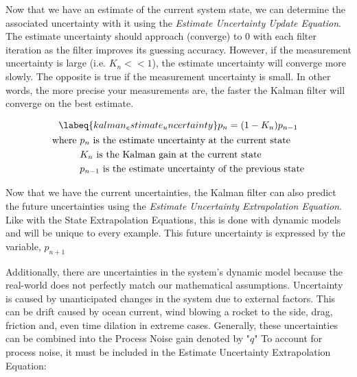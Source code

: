 
Now that we have an estimate of the current system state, we can determine the associated uncertainty with it using the \textit{Estimate Uncertainty Update Equation}. 
The estimate uncertainty should approach (converge) to 0 with each filter iteration as the filter improves its guessing accuracy.
However, if the measurement uncertainty is large (i.e. $K_n << 1$), the estimate uncertainty will converge more slowly.
The opposite is true if the measurement uncertainty is small.
In other words, the more precise your measurements are, the faster the Kalman filter will converge on the best estimate.

\begin{gather} \labeq{kalman_estimate_uncertainty}
    p_{n} = (1-K_n)p_{n-1} \\
    \begin{aligned}
        \text{where } &p_{n} \text{ is the estimate uncertainty at the current state} \\
                      &K_n \text{ is the Kalman gain at the current state} \\
                      &p_{n-1} \text{ is the estimate uncertainty of the previous state}
    \end{aligned} \notag
\end{gather}

Now that we have the current uncertainties, the Kalman filter can also predict the future uncertainties using the \textit{Estimate Uncertainty Extrapolation Equation}. 
Like with the State Extrapolation Equations, this is done with dynamic models and will be unique to every example.
This future uncertainty is expressed by the variable, $p_{n+1}$

Additionally, there are uncertainties in the system's dynamic model because the real-world does not perfectly match our mathematical assumptions.
Uncertainty is caused by unanticipated changes in the system due to external factors.
This can be drift caused by ocean current, wind blowing a rocket to the side, drag, friction and, even time dilation in extreme cases.
Generally, these uncertainties can be combined into the Process Noise gain denoted by "$q$"
To account for process noise, it must be included in the Estimate Uncertainty Extrapolation Equation:

